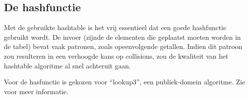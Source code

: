 \subsection{De hashfunctie} \label{sec:hashfunc}

Met de gebruikte hashtable is het vrij essentieel dat een goede hashfunctie gebruikt wordt. De invoer (zijnde de elementen die geplaatst moeten worden in de tabel) bevat vaak patronen, zoals opeenvolgende getallen. Indien dit patroon zou resulteren in een verhoogde kans op collisions, zou de kwaliteit van het hashtable algoritme al snel achteruit gaan.

Voor de hasfunctie is gekozen voor ``lookup3'', een publiek-domein algoritme. Zie \cite{hashing} voor meer informatie.

% 

